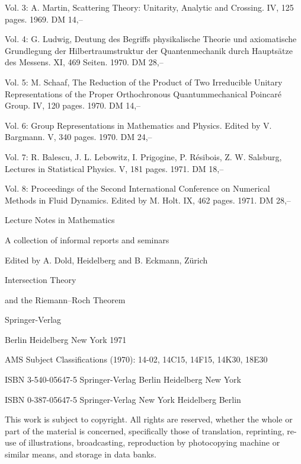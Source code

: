 Vol. 3: A. Martin, Scattering Theory: Unitarity, Analytic and Crossing.
IV, 125 pages. 1969. DM 14,--

Vol. 4: G. Ludwig, Deutung des Begriffs physikalische Theorie und axiomatische
Grundlegung der Hilbertraumstruktur der Quantenmechanik durch Hauptsätze des
Messens. XI, 469 Seiten. 1970. DM 28,--

Vol. 5: M. Schaaf, The Reduction of the Product of Two Irreducible Unitary
Representations of the Proper Orthochronous Quantummechanical Poincaré Group.
IV, 120 pages. 1970. DM 14,--

Vol. 6: Group Representations in Mathematics and Physics. Edited by V. Bargmann.
V, 340 pages. 1970. DM 24,--

Vol. 7: R. Balescu, J. L. Lebowitz, I. Prigogine, P. Résibois, Z. W. Salsburg,
Lectures in Statistical Physics. V, 181 pages. 1971. DM 18,--

Vol. 8: Proceedings of the Second International Conference on Numerical Methods
in Fluid Dynamics. Edited by M. Holt. IX, 462 pages. 1971. DM 28,--

%
\begin{center}
{\Large Lecture Notes in Mathematics}\par
A collection of informal reports and seminars\par
Edited by A. Dold, Heidelberg and B. Eckmann, Zürich\par
{}\par
\bigskip
{\Large Intersection Theory\par
and the Riemann--Roch Theorem}\par
\bigskip
Springer-Verlag\par
Berlin \textperiodcentered{} Heidelberg \textperiodcentered{} New York 1971
\end{center}

%
AMS Subject Classifications (1970): 14-02, 14C15, 14F15, 14K30, 18E30

ISBN 3-540-05647-5 Springer-Verlag Berlin \textperiodcentered{} Heidelberg \textperiodcentered{} New York\par
ISBN 0-387-05647-5 Springer-Verlag New York \textperiodcentered{} Heidelberg \textperiodcentered{} Berlin

This work is subject to copyright. All rights are reserved, whether the whole
or part of the material is concerned, specifically those of translation,
reprinting, re-use of illustrations, broadcasting, reproduction by photocopying
machine or similar means, and storage in data banks.

